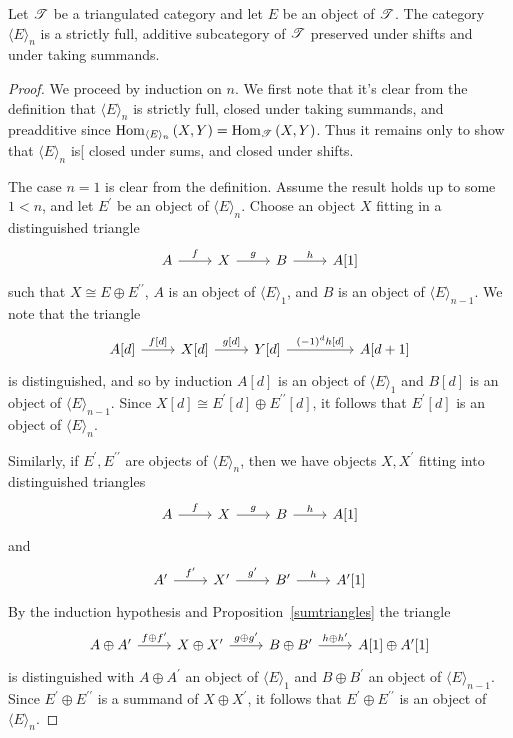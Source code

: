 \documentclass[dissertation.tex]{subfiles}
\begin{document}
\begin{lem}
  Let $\mathscr{T}$ be a triangulated category and let $E$ be an object of $\mathscr{T}$.
  The category $\langle E \rangle_n$ is a strictly full, additive subcategory of $\mathscr{T}$ preserved under shifts and under taking summands.
  
  \begin{proof}
    We proceed by induction on $n$.
    We first note that it's clear from the definition that $\langle E \rangle_n$ is strictly full, closed under taking summands, and preadditive since $\operatorname{Hom}_{\langle E \rangle_n}\left(X,Y\right) = \operatorname{Hom}_{\mathscr{T}}\left(X,Y\right)$.
    Thus it remains only to show that $\langle E \rangle_n$ is[ closed under sums, and closed under shifts.
    
    The case $n = 1$ is clear from the definition.
    Assume the result holds up to some $1 < n$, and let $E^\prime$ be an object of $\langle E \rangle_n$.
    Choose an object $X$ fitting in a distinguished triangle
    $$\begin{tikzcd}
      A \arrow{r}{f} & X \arrow{r}{g} & B \arrow{r}{h} & A[1]
    \end{tikzcd}$$
    such that $X \cong E \oplus E^{\prime\prime}$, $A$ is an object of $\langle E \rangle_1$, and $B$ is an object of $\langle E \rangle_{n-1}$.
    We note that the triangle
    $$\begin{tikzcd}
      A[d] \arrow{r}{f[d]} & X[d] \arrow{r}{g[d]} & Y[d] \arrow{rr}{(-1)^{d}h[d]} && A[d+1]
    \end{tikzcd}$$
    is distinguished, and so by induction $A[d]$ is an object of $\langle E \rangle_1$ and $B[d]$ is an object of $\langle E \rangle_{n-1}$.
    Since $X[d] \cong E^\prime[d] \oplus E^{\prime\prime}[d]$, it follows that $E^\prime[d]$ is an object of $\langle E \rangle_n$.
    
    Similarly, if $E^\prime, E^{\prime\prime}$ are objects of $\langle E \rangle_n$, then we have objects $X, X^\prime$ fitting into distinguished triangles
    $$\begin{tikzcd}
      A \arrow{r}{f} & X \arrow{r}{g} & B \arrow{r}{h} & A[1]
    \end{tikzcd}$$
    and
    $$\begin{tikzcd}
      A^\prime \arrow{r}{f^\prime} & X^\prime \arrow{r}{g^\prime} & B^\prime \arrow{r}{h} & A^\prime[1]
    \end{tikzcd}$$
    By the induction hypothesis and Proposition~\ref{sumtriangles} the triangle
    $$\begin{tikzcd}
      A \oplus A^\prime \arrow{r}{f \oplus f^\prime} & X \oplus X^\prime \arrow{r}{g \oplus g^\prime} & B \oplus B^\prime \arrow{r}{h \oplus h^\prime} & A[1] \oplus A^\prime[1]
    \end{tikzcd}$$
    is distinguished with $A \oplus A^\prime$ an object of $\langle E \rangle_1$ and $B \oplus B^\prime$ an object of $\langle E \rangle_{n-1}$.
    Since $E^\prime \oplus E^{\prime\prime}$ is a summand of $X \oplus X^\prime$, it follows that $E^\prime \oplus E^{\prime\prime}$ is an object of $\langle E \rangle_n$.
  \end{proof}
\end{lem}
\end{document}
